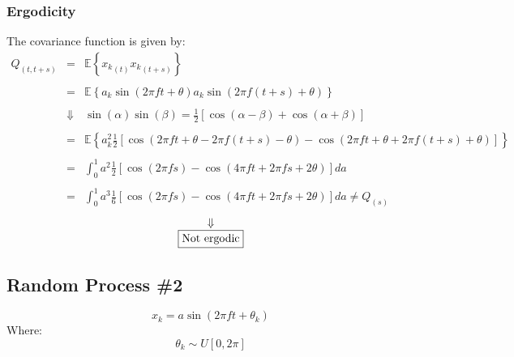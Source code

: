 \documentclass[11pt, a4paper]{article}
\begin{document}
\subsubsection{Ergodicity}
The covariance function is given by:
\begin{equation}
    \begin{array}{rcl}
        Q_{\left(t,t+s\right)} & = & \displaystyle \mathbb{E}\left\{{x_k}_{\left(t\right)}{x_k}_{\left(t+s\right)}\right\} \\\\
        & = & \displaystyle \mathbb{E}\left\{a_k\sin{\left(2\pi ft+\theta\right)}a_k\sin{\left(2\pi f\left(t+s\right)+\theta\right)}\right\} \\\\
        & \Downarrow & \displaystyle \sin{\left(\alpha\right)}\sin{\left(\beta\right)}=\frac{1}{2}\left[\cos\left(\alpha-\beta\right)+\cos\left(\alpha+\beta\right)\right] \\\\
        & = & \displaystyle \mathbb{E}\left\{a_k^2\frac{1}{2}\left[\cos\left(2\pi ft+\theta-2\pi f\left(t+s\right)-\theta\right)-\cos\left(2\pi ft+\theta+2\pi f\left(t+s\right)+\theta\right)\right]\right\} \\\\
        & = & \displaystyle \int_{0}^{1}{a^2\frac{1}{2}\left[\cos\left(2\pi fs\right)-\cos\left(4\pi ft+2\pi fs+2\theta\right)\right]da} \\\\
        & = & \displaystyle \int_{0}^{1}{a^3\frac{1}{6}\left[\cos\left(2\pi fs\right)-\cos\left(4\pi ft+2\pi fs+2\theta\right)\right]da}\ne Q_{\left(s\right)}
    \end{array}
\end{equation}
\begin{equation*}
    \begin{array}{c}
        \Downarrow \\
        \boxed{$\text{Not ergodic}$}
    \end{array}
\end{equation*}
\subsection{Random Process \#2}
\begin{equation}
    x_k=a\sin{\left(2\pi ft+\theta_k\right)}
\end{equation}
Where:
\begin{equation}
    \theta_k\sim U\left[0,2\pi\right]
\end{equation}
\end{document}
